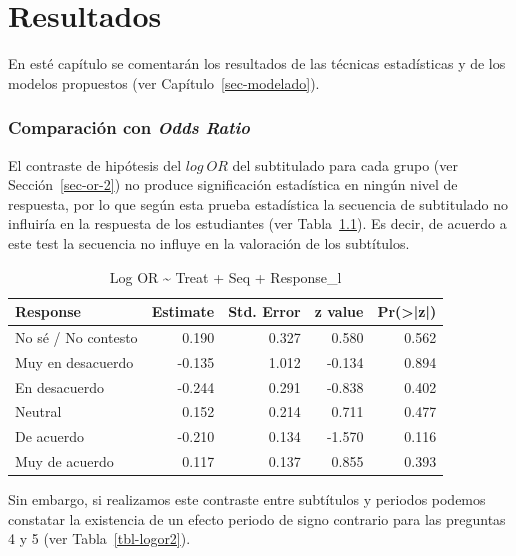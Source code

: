 \documentclass[
  12pt,
  a4paper,
  extrafontsizes,
  onecolumn,
  openright,
  table]{memoir}
\begin{document}

\hypertarget{sec-resultados}{%
\chapter{Resultados}\label{sec-resultados}}

En esté capítulo se comentarán los resultados de las técnicas
estadísticas y de los modelos propuestos (ver
Capítulo~\ref{sec-modelado}).

\hypertarget{sec-or-3}{%
\subsection{\texorpdfstring{Comparación con \emph{Odds
Ratio}}{Comparación con Odds Ratio}}\label{sec-or-3}}

El contraste de hipótesis del \(log\ OR\) del subtitulado para cada
grupo (ver Sección~\ref{sec-or-2}) no produce significación estadística
en ningún nivel de respuesta, por lo que según esta prueba estadística
la secuencia de subtitulado no influiría en la respuesta de los
estudiantes (ver Tabla~\ref{tbl-logor1}). Es decir, de acuerdo a este
test la secuencia no influye en la valoración de los subtítulos.

\hypertarget{tbl-logor1}{}
\begin{longtable}{lrrrr}
\caption{\label{tbl-logor1}Log OR \textasciitilde{} Treat + Seq + Response\_l }\tabularnewline

\toprule
Response & Estimate & Std. Error & z value & Pr(>|z|) \\ 
\midrule
No sé / No contesto & 0.190 & 0.327 & 0.580 & 0.562 \\ 
Muy en desacuerdo & -0.135 & 1.012 & -0.134 & 0.894 \\ 
En desacuerdo & -0.244 & 0.291 & -0.838 & 0.402 \\ 
Neutral & 0.152 & 0.214 & 0.711 & 0.477 \\ 
De acuerdo & -0.210 & 0.134 & -1.570 & 0.116 \\ 
Muy de acuerdo & 0.117 & 0.137 & 0.855 & 0.393 \\ 
\bottomrule
\end{longtable}

Sin embargo, si realizamos este contraste entre subtítulos y periodos
podemos constatar la existencia de un efecto periodo de signo contrario
para las preguntas 4 y 5 (ver Tabla~\ref{tbl-logor2}).
\end{document}
